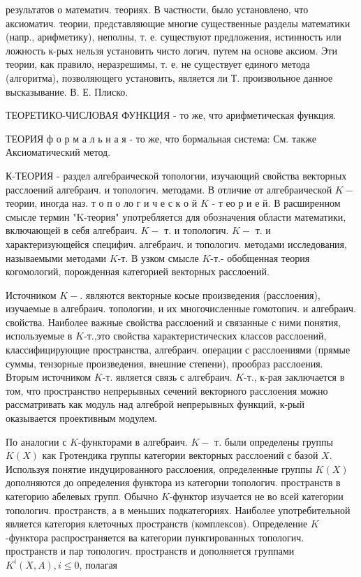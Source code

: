 \documentclass[10pt]{article}
\begin{document}
результатов о математич. теориях. В частности, было установлено, что аксиоматич. теории, представляющие многие существенные разделы математики (напр., арифметику), неполны, т. е. существуют предложения, истинность или ложность к-рых нельзя установить чисто логич. путем на основе аксиом. Эти теории, как правило, неразрешимы, т. е. не существует единого метода (алгоритма), позволяющего установить, является ли Т. произвольное данное высказывание. В. Е. Плиско.



ТЕОРЕТИКО-ЧИСЛОВАЯ ФУНКЦИЯ - то же, что арифметическая функция.



ТЕОРИЯ ф о р м а л ь н а я - то же, что бормальная система: См. также Аксиоматический метод.



К-ТЕОРИЯ - раздел алгебраической топологии, изучающий свойства векторных расслоений алгебраич. и топологич. методами. В отличие от алгебраической $K-$ теории, иногда наз. т о п о ло г и ч е с к о й $K$ - т ео р и е й. В расширенном смысле термин "K-теория" употребляется для обозначения области математики, включающей в себя алгебраич. $K-$ т. и топологич. $K-$ т. и характеризующейся специфич. алгебраич. и топологич. методами исследования, называемыми методами $K$-т. В узком смысле $K$-т.- обобщенная теория когомологий, порожденная категорией векторных расслоений.



Источником $K-$. являются векторные косые произведения (расслоения), изучаемые в алгебраич. топологии, и их многочисленные гомотопич. и алгебраич. свойства. Наиболее важные свойства расслоений и связанные с ними понятия, используемые в $K$-т.,это свойства характеристических классов расслоений, классифицирующие пространства, алгебраич. операции с расслоениями (прямые суммы, тензорные произведения, внешние степени), прообраз расслоения. Вторым источником $K$-т. является связь с алгебраич. $K$-т., к-рая заключается в том, что пространство непрерывных сечений векторного расслоения можно рассматривать как модуль над алгеброй непрерывных функций, к-рый оказывается проективным модулем.



По аналогии с $K$-функторами в алгебраич. $K-$ т. были определены группы $K(X)$ как Гротендика группы категории векторных расслоений с базой $X$. Используя понятие индуцированного расслоения, определенные группы $K(X)$ дополняются до определения функтора из категории топологич. пространств в категорию абелевых групп. Обычно $K$-функтор изучается не во всей категории топологич. пространств, а в меньших подкатегориях. Наиболее употребительной является категория клеточных пространств (комплексов). Определение $K$-функтора распространяется ва категории пункгированных топологич. пространств и пар топологич. пространств и дополняется группами $K^{i}(X, A), i \leqslant 0$, полагая
\end{document}
